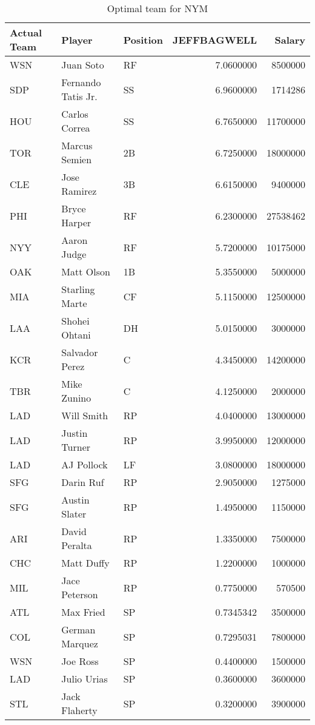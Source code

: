\begin{table}

\caption{Optimal team for NYM}
\centering
\begin{tabular}[t]{l|l|l|r|r}
\hline
Actual Team & Player & Position & JEFFBAGWELL & Salary\\
\hline
WSN & Juan Soto & RF & 7.0600000 & 8500000\\
\hline
SDP & Fernando Tatis Jr. & SS & 6.9600000 & 1714286\\
\hline
HOU & Carlos Correa & SS & 6.7650000 & 11700000\\
\hline
TOR & Marcus Semien & 2B & 6.7250000 & 18000000\\
\hline
CLE & Jose Ramirez & 3B & 6.6150000 & 9400000\\
\hline
PHI & Bryce Harper & RF & 6.2300000 & 27538462\\
\hline
NYY & Aaron Judge & RF & 5.7200000 & 10175000\\
\hline
OAK & Matt Olson & 1B & 5.3550000 & 5000000\\
\hline
MIA & Starling Marte & CF & 5.1150000 & 12500000\\
\hline
LAA & Shohei Ohtani & DH & 5.0150000 & 3000000\\
\hline
KCR & Salvador Perez & C & 4.3450000 & 14200000\\
\hline
TBR & Mike Zunino & C & 4.1250000 & 2000000\\
\hline
LAD & Will Smith & RP & 4.0400000 & 13000000\\
\hline
LAD & Justin Turner & RP & 3.9950000 & 12000000\\
\hline
LAD & AJ Pollock & LF & 3.0800000 & 18000000\\
\hline
SFG & Darin Ruf & RP & 2.9050000 & 1275000\\
\hline
SFG & Austin Slater & RP & 1.4950000 & 1150000\\
\hline
ARI & David Peralta & RP & 1.3350000 & 7500000\\
\hline
CHC & Matt Duffy & RP & 1.2200000 & 1000000\\
\hline
MIL & Jace Peterson & RP & 0.7750000 & 570500\\
\hline
ATL & Max Fried & SP & 0.7345342 & 3500000\\
\hline
COL & German Marquez & SP & 0.7295031 & 7800000\\
\hline
WSN & Joe Ross & SP & 0.4400000 & 1500000\\
\hline
LAD & Julio Urias & SP & 0.3600000 & 3600000\\
\hline
STL & Jack Flaherty & SP & 0.3200000 & 3900000\\
\hline
\end{tabular}
\end{table}
